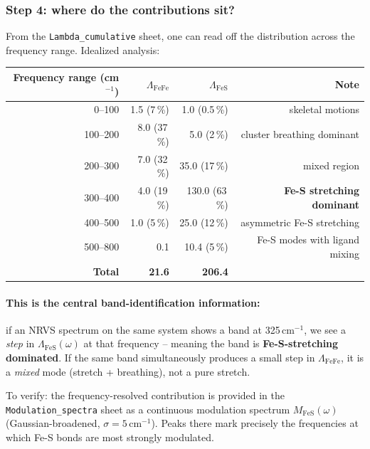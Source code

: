 \documentclass[11pt,a4paper,twoside]{article}
\theoremstyle{remark}
\begin{document}
\subsubsection*{Step 4: where do the contributions sit?}

From the \texttt{Lambda\_cumulative} sheet, one can read off the
distribution across the frequency range. Idealized analysis:

\begin{center}
\begin{tabular}{rrrr}
  \toprule
  \textbf{Frequency range (cm$^{-1}$)} & $\Lambda_\text{FeFe}$ & $\Lambda_\text{FeS}$ & \textbf{Note} \\
  \midrule
  0--100   & 1.5 (7\,\%) & 1.0 (0.5\,\%) & skeletal motions \\
  100--200 & 8.0 (37\,\%) & 5.0 (2\,\%)  & cluster breathing dominant \\
  200--300 & 7.0 (32\,\%) & 35.0 (17\,\%) & mixed region \\
  300--400 & 4.0 (19\,\%) & 130.0 (63\,\%) & \textbf{Fe-S stretching dominant} \\
  400--500 & 1.0 (5\,\%) & 25.0 (12\,\%) & asymmetric Fe-S stretching \\
  500--800 & 0.1         & 10.4 (5\,\%)   & Fe-S modes with ligand mixing \\
  \midrule
  \textbf{Total} & \textbf{21.6} & \textbf{206.4} & \\
  \bottomrule
\end{tabular}
\end{center}

\paragraph{This is the central band-identification information:}
if an NRVS spectrum on the same system shows a band at
325\,cm$^{-1}$, we see a \emph{step} in
$\Lambda_\text{FeS}(\omega)$ at that frequency -- meaning the
band is \textbf{Fe-S-stretching dominated}. If the same band
simultaneously produces a small step in $\Lambda_\text{FeFe}$,
it is a \emph{mixed} mode (stretch + breathing), not a pure
stretch.

To verify: the frequency-resolved contribution is provided in the
\texttt{Modulation\_spectra} sheet as a continuous modulation
spectrum $M_\text{FeS}(\omega)$ (Gaussian-broadened,
$\sigma = 5$\,cm$^{-1}$). Peaks there mark precisely the
frequencies at which Fe-S bonds are most strongly modulated.
\end{document}
